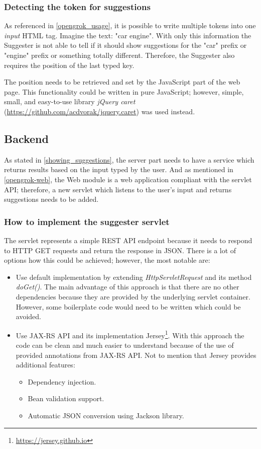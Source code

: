 \subsubsection{Detecting the token for suggestions}
As referenced in \ref{opengrok_usage}, it is possible to write multiple tokens into one \textit{input} HTML tag.
Imagine the text: "car engine". With only this information the Suggester is not able to tell if it should show
suggestions for the "car" prefix or "engine" prefix or something totally different. Therefore, the Suggester also requires the position of the last typed
key.

The position needs to be retrieved and set by the JavaScript part of the web page. This functionality could be written in
pure JavaScript; however, simple, small, and easy-to-use library \textit{jQuery caret} (\url{https://github.com/acdvorak/jquery.caret})
was used instead.

\subsection{Backend}
As stated in \ref{showing_suggestions}, the server part needs to have a service which returns results based on the
input typed by the user. And as mentioned in \ref{opengrok-web}, the Web module is a web application compliant with
the servlet API; therefore, a new servlet which listens to the user's input and returns suggestions needs to be added.

\subsubsection{How to implement the suggester servlet}
The servlet represents a simple REST API endpoint
because it needs to respond to HTTP GET requests and return the response in JSON.
There is a lot of options how this could be achieved; however, the most notable are:
\begin{itemize}
    \item Use default implementation by extending \textit{HttpServletRequest} and its method \textit{doGet()}. The main
    advantage of this approach is that there are no other dependencies because they are provided by the underlying servlet container.
     However, some boilerplate code would need
    to be written which could be avoided.
    \item Use JAX-RS API and its implementation Jersey\footnote{\url{https://jersey.github.io}}. With this approach the
    code can be clean and much easier to understand because of the use of provided annotations from JAX-RS API.
    Not to mention that Jersey provides additional features:
    \begin{itemize}
        \item Dependency injection.
        \item Bean validation support.
        \item Automatic JSON conversion using Jackson library.
    \end{itemize}
\end{itemize}

